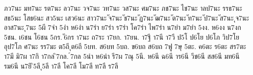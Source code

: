 {ภว7นะ
มท7นะ
รต7นะ
ลว7นะ
วจ7นะ
วท7นะ
วส7นะ
ศม7นะ
ภช7นะ
ไช7นะ
าลป7นะ
รรธ7นะ
สธ5นะ
โสธ6นะ
สว5นะ
เสว6นะ
สาว7นะ
ัจ7นะ
ัช7นะ
ัฏ7นะ
ัฒ7นะ
ัต7นะ
ัท7นะ
ัป7นะ
ัส7นะ
ุจ7นะ
อาส7นะ
ุ7นะ
5ผี
7จำ
5งำ
ห6งำ
น7รำ
ย7รำ
ร7รำ
โค7รำ
ไพ7รำ
น7ยำ
ม7ยำ
5งง.
ห6งง
น7งก
5ชน.
เ6ชน
โ6ชน
5กร.
ั6กร
า7นะ
ถ7ระ
า7ยก.
า7ยน.
า7ฐี
า7นี
า7วี
ป5โ
ป6โย
ป6โภ
วิป7โย
อุป7โภ
ศ7นะ
รร7มะ
ต5ถี
ุต6ถี
5บท.
ส6บท
5บถ.
ข6บถ
ส6บถ
7ฟู
7ษุ
5ตะ.
ค6ตะ
ร6ตะ
สร7ตะ
า7มี
มิ7ผ
า7กิ
า7กล
ิ7กล.
์7กล
5นำ
ห6นำ
รี7ผ
7ณุ
5นี.
ห6นี
ฉ6นี
าร6นี
วีช6นี
สส6นี
มท6นี
รม6นี
น7ยิ
ิ5ลี
ุ5ลี
า7ลี
โค7ลี
โม7ลี
ท7ลี
ร7ลี
}
